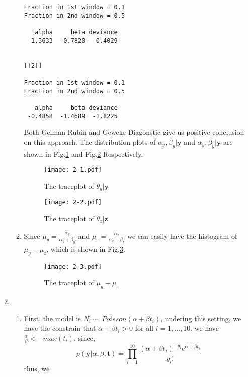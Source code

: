 \documentclass[twoside,11pt]{amsart}
\begin{document}
\begin{enumerate}
\begin{enumerate}
\begin{small}
\begin{verbatim}
Fraction in 1st window = 0.1
Fraction in 2nd window = 0.5 

   alpha     beta deviance 
  1.3633   0.7820   0.4029 


[[2]]

Fraction in 1st window = 0.1
Fraction in 2nd window = 0.5 

   alpha     beta deviance 
 -0.4858  -1.4689  -1.8225 
\end{verbatim}
\end{small}
    Both Gelman-Rubin and Geweke Diagonstic give us positive
    conclusion on this approach.
The distribution plots of $\alpha_y, \beta_y|\bm y$  and  $\alpha_y,
\beta_y|\bm y$ are shown in 
Fig.\ref{fig:2-1} and Fig.\ref{fig:2-2} Respectively.
\begin{figure}[h]
        \texttt{[image: 2-1.pdf]}
        \caption{The traceplot of $\theta_y|\bm y$}\label{fig:2-1}
      \end{figure}
\begin{figure}[h]
        \texttt{[image: 2-2.pdf]}
        \caption{The traceplot of $\theta_z|\bm z$}\label{fig:2-2}
      \end{figure}

  \item
    Since $\mu_y = \frac{\alpha_y}{\alpha_y + \beta_y}$ and $\mu_z =
    \frac{\alpha_z}{\alpha_z + \beta_z}$ 
    we can easily have the histogram of $\mu_y-\mu_z$, which is shown
    in Fig.\ref{fig:2-3}.
    \begin{figure}[h]
        \texttt{[image: 2-3.pdf]}
        \caption{The traceplot of $\mu_y - \mu_z$}\label{fig:2-3}
      \end{figure}    
    
  \end{enumerate}
\item
  \begin{enumerate}
  \item
    First, the model is  $N_i\sim~ Poisson(\alpha + \beta t_i)$,
    undering this setting, we have the constrain that $\alpha+\beta
    t_i > 0$ for all $i = 1, \ldots, 10$. we have
    $\frac{\alpha}{\beta} < -max(t_i)$.  
    since,
    \[
    p(\bm y|\alpha, \beta, \bm t) = \prod_{i=1}^{10}\frac{(\alpha+\beta
      t_i)^{-y_i}e^{\alpha+\beta t_i}}{y_i!} 
    \]
    thus, we 
    

\end{enumerate}
\end{enumerate}
\end{document}

